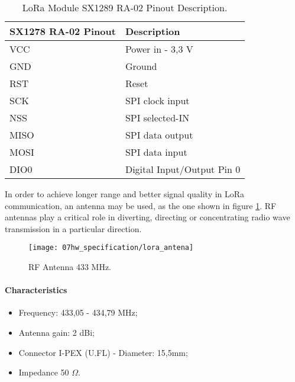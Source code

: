 \begin{table}[H]
	\centering
		\begin{tabular}{|m{5cm}|m{6cm}|}
			\hline
			\textbf{SX1278 RA-02 Pinout} & \textbf{Description}
			\\\hline\hline
		
			VCC & Power in - 3,3 V\\\hline
			GND & Ground\\\hline
			RST & Reset \\\hline
			SCK & SPI clock input\\\hline
			NSS & SPI selected-IN\\\hline
			MISO & SPI data output\\\hline
			MOSI & SPI data input\\\hline
			DIO0 & Digital Input/Output Pin 0\\\hline
			\hline
		\end{tabular}
	
	\caption{LoRa Module SX1289 RA-02 Pinout Description.}
	\label{table:lora_module_pinout}
\end{table}

In order to achieve longer range and better signal quality in LoRa communication, an antenna may be used, as the one shown in figure \ref{fig:lora_antena}. RF antennas play a critical role in diverting, directing or concentrating radio wave transmission in a particular direction. 


\begin{figure}[H]
	\centering
	\texttt{[image: 07hw\_specification/lora\_antena]}
	\caption{RF Antenna 433 MHz.}
	\label{fig:lora_antena}
\end{figure}

\paragraph*{Characteristics}
\begin{itemize}
	\item Frequency: 433,05 - 434,79 MHz;
	\item Antenna gain: 2 dBi;
	\item Connector I-PEX (U.FL) - Diameter: 15,5mm;
	\item Impedance 50 $\Omega$.
\end{itemize}

